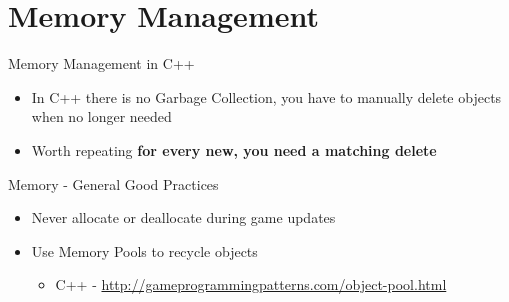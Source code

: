 \part{Memory Management}
\frame{\partpage}

\begin{frame}{Memory Management in C++}
	\begin{itemize}
		\pause \item In C++ there is no Garbage Collection, you have to manually delete objects when no longer needed
		\pause \item Worth repeating  \textbf{for every new, you need a matching delete}
	\end{itemize}
\end{frame}

\begin{frame}{Memory - General Good Practices}
	\begin{itemize}
		\pause \item Never allocate or deallocate during game updates
		\pause \item Use Memory Pools to recycle objects
		\begin{itemize}
			\pause \item C++ - \url{http://gameprogrammingpatterns.com/object-pool.html} 
		\end{itemize}  
	\end{itemize}
\end{frame}
